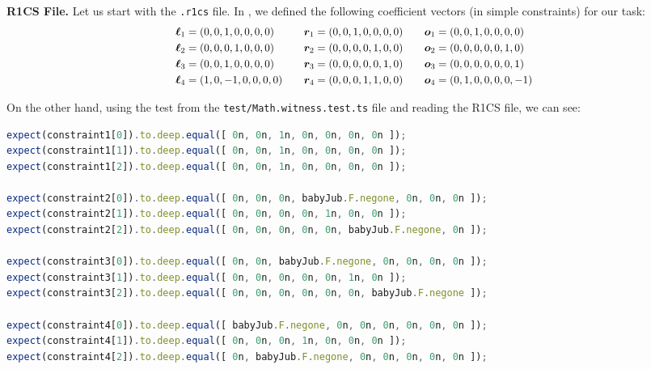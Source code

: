\documentclass[../lecture-notes-148x210.tex]{subfiles}
\begin{document}
\textbf{R1CS File.} Let us start with the \texttt{.r1cs} file. In ,
we defined the following coefficient vectors (in simple constraints) for our
task:
\begin{equation*}
    \scalebox{0.95}{$
    \begin{aligned}
        \boldsymbol{\ell}_1 &= (0, 0, 1, 0, 0, 0, 0) & \quad \boldsymbol{r}_1 &= (0, 0, 1, 0, 0, 0, 0) & \quad \boldsymbol{o}_1 &= (0, 0, 1, 0, 0, 0, 0) \\
        \boldsymbol{\ell}_2 &= (0, 0, 0, 1, 0, 0, 0) & \quad \boldsymbol{r}_2 &= (0, 0, 0, 0, 1, 0, 0) & \quad \boldsymbol{o}_2 &= (0, 0, 0, 0, 0, 1, 0) \\
        \boldsymbol{\ell}_3 &= (0, 0, 1, 0, 0, 0, 0) & \quad \boldsymbol{r}_3 &= (0, 0, 0, 0, 0, 1, 0) & \quad \boldsymbol{o}_3 &= (0, 0, 0, 0, 0, 0, 1) \\
        \boldsymbol{\ell}_4 &= (1, 0, -1, 0, 0, 0, 0) & \quad \boldsymbol{r}_4 &= (0, 0, 0, 1, 1, 0, 0) & \quad \boldsymbol{o}_4 &= (0, 1, 0, 0, 0, 0, -1)
    \end{aligned}
    $}
\end{equation*}

On the other hand, using the test from the \texttt{test/Math.witness.test.ts} file and reading the R1CS file, we can see:

\begin{center}
    \begin{tcolorbox}[enhanced,
        width=1.0\textwidth,
        title={\textbf{test/Math.witness.test.ts}},
        coltitle=gray!25!black,
        attach boxed title to top center={yshift=-2mm,yshifttext=-1mm},
        boxed title style={size=small,colframe=gray!75!black,
        colback=Green!30!white,boxrule=1.5pt},
        top=-0.3cm,
        bottom=-0.3cm]
        \begin{lstlisting}[language=TypeScript,numbers=none,basicstyle=\scriptsize\ttfamily\scriptsize]
expect(constraint1[0]).to.deep.equal([ 0n, 0n, 1n, 0n, 0n, 0n, 0n ]);
expect(constraint1[1]).to.deep.equal([ 0n, 0n, 1n, 0n, 0n, 0n, 0n ]);
expect(constraint1[2]).to.deep.equal([ 0n, 0n, 1n, 0n, 0n, 0n, 0n ]);

expect(constraint2[0]).to.deep.equal([ 0n, 0n, 0n, babyJub.F.negone, 0n, 0n, 0n ]);
expect(constraint2[1]).to.deep.equal([ 0n, 0n, 0n, 0n, 1n, 0n, 0n ]);
expect(constraint2[2]).to.deep.equal([ 0n, 0n, 0n, 0n, 0n, babyJub.F.negone, 0n ]);

expect(constraint3[0]).to.deep.equal([ 0n, 0n, babyJub.F.negone, 0n, 0n, 0n, 0n ]);
expect(constraint3[1]).to.deep.equal([ 0n, 0n, 0n, 0n, 0n, 1n, 0n ]);
expect(constraint3[2]).to.deep.equal([ 0n, 0n, 0n, 0n, 0n, 0n, babyJub.F.negone ]);

expect(constraint4[0]).to.deep.equal([ babyJub.F.negone, 0n, 0n, 0n, 0n, 0n, 0n ]);
expect(constraint4[1]).to.deep.equal([ 0n, 0n, 0n, 1n, 0n, 0n, 0n ]);
expect(constraint4[2]).to.deep.equal([ 0n, babyJub.F.negone, 0n, 0n, 0n, 0n, 0n ]);
        \end{lstlisting}
    \end{tcolorbox}
\end{center}
\end{document}
